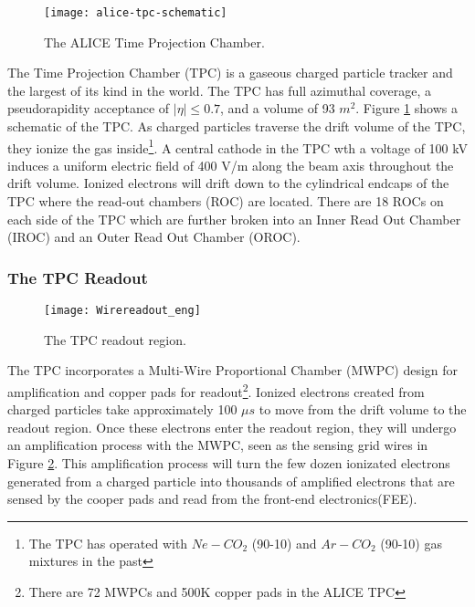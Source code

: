 \begin{figure}[b!]
\texttt{[image: alice-tpc-schematic]}
\centering
\caption{The ALICE Time Projection Chamber\cite{2010NIMPA.622..316A}.}
\label{fig:TPC}
\end{figure}

The Time Projection Chamber (TPC)\cite{2010NIMPA.622..316A} is a gaseous charged particle tracker and the largest of its kind in the world.  The TPC has full azimuthal coverage, a pseudorapidity acceptance of $ \left | \eta \right | \leq 0.7$, and a volume of 93 $m^{2}$.  Figure \ref{fig:TPC} shows a schematic of the TPC.  As charged particles traverse the drift volume of the TPC, they ionize the gas inside\footnote{The TPC has operated with $Ne-CO_{2}$ (90-10) and $Ar-CO_{2}$ (90-10) gas mixtures in the past}.  A central cathode in the TPC wth a voltage of 100 kV induces a uniform electric field of 400 V/m along the beam axis throughout the drift volume.  Ionized electrons will drift down to the cylindrical endcaps of the TPC where the read-out chambers (ROC) are located.  There are 18 ROCs on each side of the TPC which are further broken into an Inner Read Out Chamber (IROC) and an Outer Read Out Chamber (OROC).  

\subsubsection{The TPC Readout}\label{sec:tpcread}

\begin{figure}[b!]
\texttt{[image: Wirereadout\_eng]}
\centering
\caption{The TPC readout region\cite{diener}.}
\label{fig:TPCreadout}
\end{figure}

The TPC incorporates a Multi-Wire Proportional Chamber (MWPC) design for amplification and copper pads for readout\footnote{There are 72 MWPCs and 500K copper pads in the ALICE TPC}. Ionized electrons created from charged particles take approximately 100 $\mu s$ to move from the drift volume to the readout region.  Once these electrons enter the readout region, they will undergo an amplification process with the MWPC, seen as the sensing grid wires in Figure \ref{fig:TPCreadout}.  This amplification process will turn the few dozen ionizated electrons generated from a charged particle into thousands of amplified electrons that are sensed by the cooper pads and read from the front-end electronics(FEE).  

